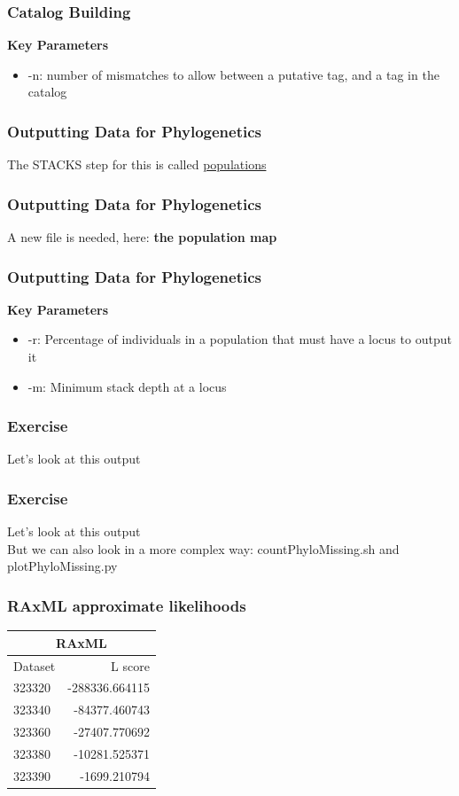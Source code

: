 \documentclass{beamer}
\begin{document}
\begin{frame}
\frametitle{Catalog Building}
\textbf{Key Parameters}
\begin{itemize}
\item -n: number of mismatches to allow between a putative tag, and a tag in the catalog
\end{itemize}
\end{frame}

\begin{frame}
\frametitle{Outputting Data for Phylogenetics}
The STACKS step for this is called \href{http://catchenlab.life.illinois.edu/stacks/comp/populations.php}{populations} 
\end{frame}

\begin{frame}
\frametitle{Outputting Data for Phylogenetics}
A new file is needed, here: \textbf{the population map}
\end{frame}

\begin{frame}
\frametitle{Outputting Data for Phylogenetics}
\textbf{Key Parameters}
\begin{itemize}
\item -r: Percentage of individuals in a population that must have a locus to output it
\item -m: Minimum stack depth at a locus
\end{itemize}
\end{frame}

\begin{frame}
\frametitle{Exercise}
Let's look at this output
\end{frame}

\begin{frame}
\frametitle{Exercise}
Let's look at this output \\
But we can also look in a more complex way: countPhyloMissing.sh and plotPhyloMissing.py
\end{frame}

\begin{frame}
\frametitle{RAxML approximate likelihoods}
\begin{center}
\begin{tabular}{ l  | r }
  \multicolumn{2}{c}{RAxML} \\
\hline
    Dataset & L score  \\
\hline
  323320 & -288336.664115  \\
  323340 & -84377.460743 \\
  323360 & -27407.770692\\
  323380 & -10281.525371\\
  323390 & -1699.210794 \\
\end{tabular}
\end{center}
\end{frame}
\end{document}
